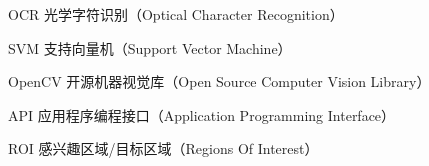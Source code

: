 ﻿\begin{denotation}
  \item[OCR] 光学字符识别（Optical Character Recognition）
  \item[SVM] 支持向量机（Support Vector Machine）
  \item[OpenCV] 开源机器视觉库（Open Source Computer Vision Library）
  \item[API] 应用程序编程接口（Application Programming Interface）
  \item[ROI] 感兴趣区域/目标区域（Regions Of Interest）
\end{denotation}
